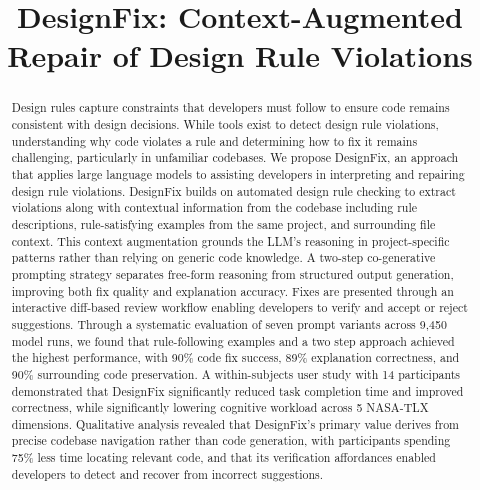 \documentclass[conference]{IEEEtran}
\begin{document}
\title{DesignFix: Context-Augmented Repair of Design Rule Violations}

\maketitle

\begin{abstract}
Design rules capture constraints that developers must follow to ensure code remains consistent with design decisions. While tools exist to detect design rule violations, understanding why code violates a rule and determining how to fix it remains challenging, particularly in unfamiliar codebases. We propose DesignFix, an approach that applies large language models to assisting developers in interpreting and repairing design rule violations. DesignFix builds on automated design rule checking to extract violations along with contextual information from the codebase including rule descriptions, rule-satisfying examples from the same project, and surrounding file context. This context augmentation grounds the LLM's reasoning in project-specific patterns rather than relying on generic code knowledge. A two-step co-generative prompting strategy separates free-form reasoning from structured output generation, improving both fix quality and explanation accuracy. Fixes are presented through an interactive diff-based review workflow enabling developers to verify and accept or reject suggestions. Through a systematic evaluation of seven prompt variants across 9,450 model runs, we found that rule-following examples and a two step approach achieved the highest performance, with 90\% code fix success, 89\% explanation correctness, and 90\% surrounding code preservation. A within-subjects user study with 14 participants demonstrated that DesignFix significantly reduced task completion time and improved correctness, while significantly lowering cognitive workload across 5 NASA-TLX dimensions. Qualitative analysis revealed that DesignFix's primary value derives from precise codebase navigation rather than code generation, with participants spending 75\% less time locating relevant code, and that its verification affordances enabled developers to detect and recover from incorrect suggestions.

\end{abstract}
\end{document}
